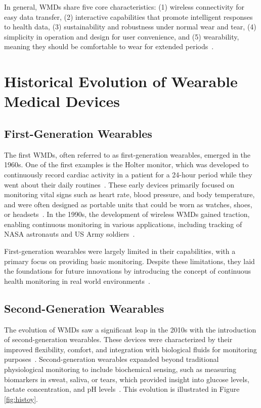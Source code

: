 \documentclass[journal]{IEEEtran}
\begin{document}
    In general, WMDs share five core characteristics: (1) wireless connectivity for easy data transfer, (2) interactive capabilities that promote intelligent responses to health data, (3) sustainability and robustness under normal wear and tear, (4) simplicity in operation and design for user convenience, and (5) wearability, meaning they should be comfortable to wear for extended periods~\cite{Lu2020}.

\section{Historical Evolution of Wearable Medical Devices}
\label{3.Historical}
    \subsection{First-Generation Wearables}

    The first WMDs, often referred to as first-generation wearables, emerged in the 1960s. One of the first examples is the Holter monitor, which was developed to continuously record cardiac activity in a patient for a 24-hour period while they went about their daily routines~\cite{Ates2022}. These early devices primarily focused on monitoring vital signs such as heart rate, blood pressure, and body temperature, and were often designed as portable units that could be worn as watches, shoes, or headsets~\cite{Fotiadis2006}. In the 1990s, the development of wireless WMDs gained traction, enabling continuous monitoring in various applications, including tracking of NASA astronauts and US Army soldiers~\cite{Luo2024}.

    First-generation wearables were largely limited in their capabilities, with a primary focus on providing basic monitoring. Despite these limitations, they laid the foundations for future innovations by introducing the concept of continuous health monitoring in real world environments~\cite{Fotiadis2006}.

    \subsection{Second-Generation Wearables}
    
    The evolution of WMDs saw a significant leap in the 2010s with the introduction of second-generation wearables. These devices were characterized by their improved flexibility, comfort, and integration with biological fluids for monitoring purposes~\cite{Ates2022}. Second-generation wearables expanded beyond traditional physiological monitoring to include biochemical sensing, such as measuring biomarkers in sweat, saliva, or tears, which provided insight into glucose levels, lactate concentration, and pH levels~\cite{Luo2024}. This evolution is illustrated in Figure \ref{fig:histoy}.
\end{document}
